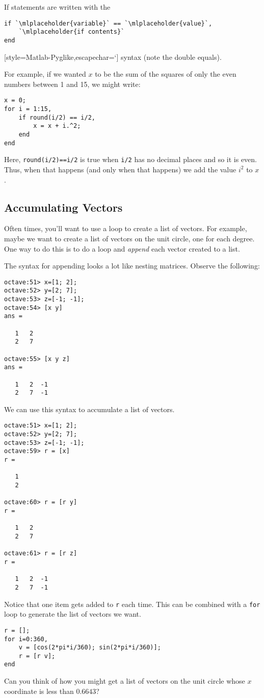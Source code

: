 \documentclass[letter]{article}
\begin{document}
	If statements are written with the 
\begin{lstlisting}[style=Matlab-Pyglike,escapechar=`]
if `\mlplaceholder{variable}` == `\mlplaceholder{value}`,
    `\mlplaceholder{if contents}`
end
\end{lstlisting}[style=Matlab-Pyglike,escapechar=`]
	syntax (note the double equals). 

	For example, if we wanted $x$ to be the sum of the squares of only the even numbers between 1 and 15, we might write:
\begin{lstlisting}[style=Matlab-Pyglike,escapechar=`]
x = 0;
for i = 1:15,
    if round(i/2) == i/2,
        x = x + i.^2;
    end
end
\end{lstlisting}

	Here, {\tt round(i/2)==i/2} is true when {\tt i/2} has no decimal places and so it is even.  Thus, when that happens
	(and only when that happens) we add the value $i^2$ to $x$.

	\subsection{Accumulating Vectors}
	Often times, you'll want to use a loop to create a list of vectors.  For example,
	maybe we want to create a list of vectors on the unit circle, one for each degree.
	One way to do this is to do a loop and \emph{append} each vector created to a list.

	The syntax for appending looks a lot like nesting matrices.  Observe the following:
	\begin{lstlisting}[style=Matlab-Pyglike,escapechar=`]
octave:51> x=[1; 2];
octave:52> y=[2; 7];
octave:53> z=[-1; -1];
octave:54> [x y]
ans =

   1   2
   2   7

octave:55> [x y z]
ans =

   1   2  -1
   2   7  -1
	\end{lstlisting}
	We can use this syntax to accumulate a list of vectors.
	\begin{lstlisting}[style=Matlab-Pyglike,escapechar=`]
octave:51> x=[1; 2];
octave:52> y=[2; 7];
octave:53> z=[-1; -1];
octave:59> r = [x]
r =

   1
   2

octave:60> r = [r y]
r =

   1   2
   2   7

octave:61> r = [r z]
r =

   1   2  -1
   2   7  -1
	\end{lstlisting}
	Notice that one item gets added to {\tt r} each time.  This can be combined with a {\tt for}
	loop to generate the list of vectors we want.
	\begin{lstlisting}[style=Matlab-Pyglike,escapechar=`]
r = [];
for i=0:360,
    v = [cos(2*pi*i/360); sin(2*pi*i/360)];
    r = [r v];
end
	\end{lstlisting}
	Can you think of how you might get a list of vectors on the unit circle whose $x$ coordinate is less than $0.6643$?
\end{document}
